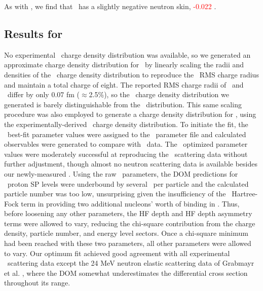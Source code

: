 As with \caForty, we find that \oSix\ has a slightly negative neutron skin,
\textcolor{red}{-0.022} \femto\meter.

\subsection{Results for \oEight}
No experimental \oEight\ charge density distribution was available, so we generated
an approximate charge density distribution for \oEight\ by linearly scaling
the radii and densities of the \oSix\ charge density distribution to reproduce the \oEight\ RMS charge
radius and maintain a total charge of eight. The reported RMS charge radii of \oSix\ and \oEight\ differ by only
0.07 fm ($\approx$2.5\%), so the \oEight\ charge density distribution
we generated is barely distinguishable from the \oSix\ distribution. This same scaling procedure was also employed to
generate a charge density distribution for \snTwelve, using the
experimentally-derived \snFour\ charge density distribution. To initiate the fit, the \oSix\ best-fit parameter values
were assigned to the \oEight\ parameter file and calculated observables were generated to compare
with \oEight\ data. The \oSix\ optimized parameter values were moderately successful at reproducing
the \oEight\ scattering data without further adjustment, though almost no neutron scattering data is
available besides our newly-measured \tot. Using the raw \oSix\ parameters, the DOM predictions for
\oEight\ proton SP levels were underbound by several \mega\electronvolt\ per
particle and the calculated particle number was too low, unsurprising
given the insufficiency of the \oSix\ Hartree-Fock term in providing
two additional nucleons' worth of binding in \oEight. Thus, before
loosening any other parameters, the HF depth and HF depth asymmetry terms were allowed to vary,
reducing the chi-square contribution from the charge density, particle number, and energy level
sectors. Once a chi-square minimum had been reached with these two parameters, all other 
parameters were allowed to vary. Our optimum fit achieved good agreement with all
experimental \oEight\ scattering data except the 24 MeV neutron elastic scattering data
of Grabmayr et al. \cite{Grabmayr1980}, where the DOM somewhat underestimates
the differential cross section throughout its range.

